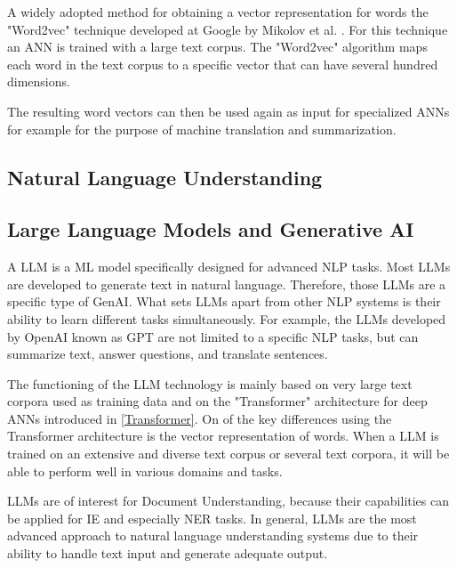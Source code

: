 A widely adopted method for obtaining a vector representation for words the "Word2vec" technique developed at Google by Mikolov et al. \cite{mikolov2013}. For this technique an \ac{ANN} is trained with a large text corpus. The "Word2vec" algorithm maps each word in the text corpus to a specific vector that can have several hundred dimensions.

The resulting word vectors can then be used again as input for specialized \acp{ANN} for example for the purpose of machine translation and summarization.

\subsection{Natural Language Understanding}
\subsection{Large Language Models and Generative AI}
A \ac{LLM} is a \ac{ML} model specifically designed for advanced \ac{NLP} tasks. Most \acp{LLM} are developed to generate text in natural language. Therefore, those \acp{LLM} are a specific type of \ac{GenAI}. What sets \acp{LLM} apart from other \ac{NLP} systems is their ability to learn different tasks simultaneously. For example, the \acp{LLM} developed by OpenAI known as \ac{GPT} are not limited to a specific \ac{NLP} tasks, but can summarize text, answer questions, and translate sentences.
\cite{radford2019language}

The functioning of the \ac{LLM} technology is mainly based on very large text corpora used as training data and on the "Transformer" architecture for deep \acp{ANN} introduced in \cref{Transformer}. On of the key differences using the Transformer architecture is the vector representation of words.  
When a \ac{LLM} is trained on an extensive and diverse text corpus or several text corpora, it will be able to perform well in various domains and tasks.
\cite{radford2019language,brown2020language}

\acp{LLM} are of interest for Document Understanding, because their capabilities can be applied for \acf{IE} and especially \acf{NER} tasks. In general, \acp{LLM} are the most advanced approach to natural language understanding systems due to their ability to handle text input and generate adequate output.
\cite{brown2020language,carbonell2021named}
